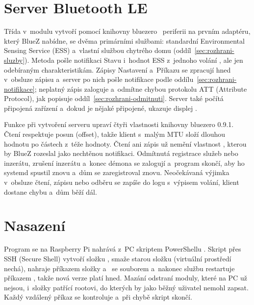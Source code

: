 \section{Server Bluetooth LE}
\label{sec:ble-server}

Třída  v~modulu  vytvoří pomocí knihovny
bluezero~\cite{bluezero} periferii  na prvním adaptéru, který BlueZ nabídne,
se dvěma primárními službami: standardní Environmental Sensing Service (ESS) a~vlastní službou
chytrého domu (oddíl~\ref{sec:rozhrani-sluzby}). Metoda  pošle notifikaci Stavu i~hodnot
ESS z~jednoho volání , ale jen odebíraným charakteristikám. Zápisy Nastavení
a~Příkazu se zpracují hned v~obsluze zápisu a~server po nich pošle notifikace podle
oddílu~\ref{sec:rozhrani-notifikace}; neplatný zápis zaloguje a~odmítne chybou protokolu ATT
(Attribute Protocol), jak popisuje oddíl~\ref{sec:rozhrani-odmitnuti}. Server také počítá
připojená zařízení a~dokud je nějaké připojené, ukazuje displej .

Funkce  při vytvoření serveru upraví čtyři vlastnosti knihovny bluezero
0.9.1. Čtení respektuje posun (offset), takže klient s~malým MTU složí dlouhou hodnotu po
částech z~téže hodnoty. Čtení ani zápis už nemění vlastnost , kterou by BlueZ rozeslal
jako nechtěnou notifikaci. Odmítnutá registrace služeb nebo inzerátu, zrušení inzerátu
a~konec démona  se zalogují a~program skončí, aby ho systemd spustil znovu
a~dům se zaregistroval znovu. Neočekávaná výjimka v~obsluze čtení, zápisu nebo odběru se
zapíše do logu s~výpisem volání, klient dostane chybu a~dům běží dál.

\section{Nasazení}
\label{sec:nasazeni}

Program se na Raspberry Pi nahrává z~PC skriptem PowerShellu . Skript
přes SSH (Secure Shell) vytvoří složku , smaže starou složku 
(virtuální prostředí  nechá), nahraje příkazem  složky 
a~ se souborem  a~nakonec službu restartuje příkazem
, takže nová verze platí hned. Mazání odstraní moduly, které
na PC už nejsou, i~složky  patřící rootovi, do kterých by  jako běžný
uživatel nemohl zapsat. Každý vzdálený příkaz se kontroluje a~při chybě skript skončí.

